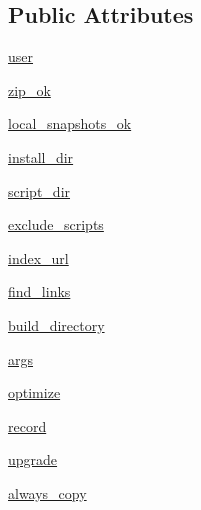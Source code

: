 \subsection*{Public Attributes}
\begin{DoxyCompactItemize}
\item 
\hyperlink{classsetuptools_1_1command_1_1easy__install_1_1easy__install_ae4bf410b8b658b1c1a709ae8947e7e2c}{user}
\item 
\hyperlink{classsetuptools_1_1command_1_1easy__install_1_1easy__install_a3cf027b47425e5bdedb5b0c6929346ba}{zip\+\_\+ok}
\item 
\hyperlink{classsetuptools_1_1command_1_1easy__install_1_1easy__install_ac990ee964a5fffad9b74da0491be48ea}{local\+\_\+snapshots\+\_\+ok}
\item 
\hyperlink{classsetuptools_1_1command_1_1easy__install_1_1easy__install_a1b80f13e00ade511bf1823bddce3341a}{install\+\_\+dir}
\item 
\hyperlink{classsetuptools_1_1command_1_1easy__install_1_1easy__install_acf30ffa16f1af2199c6342c4c7eae53c}{script\+\_\+dir}
\item 
\hyperlink{classsetuptools_1_1command_1_1easy__install_1_1easy__install_ad4f35f8a4e3aede4547ac57640dce932}{exclude\+\_\+scripts}
\item 
\hyperlink{classsetuptools_1_1command_1_1easy__install_1_1easy__install_a4f86d2376a54281ba9f8d503ba8cfcb4}{index\+\_\+url}
\item 
\hyperlink{classsetuptools_1_1command_1_1easy__install_1_1easy__install_ad44d29a7b59632e3860ec11bf8b3845d}{find\+\_\+links}
\item 
\hyperlink{classsetuptools_1_1command_1_1easy__install_1_1easy__install_addd15d5fea61ff7542f5330e1d5305c6}{build\+\_\+directory}
\item 
\hyperlink{classsetuptools_1_1command_1_1easy__install_1_1easy__install_a245326eef92af2fd2490071ec2fa271b}{args}
\item 
\hyperlink{classsetuptools_1_1command_1_1easy__install_1_1easy__install_acd3bdda216b3dad1afe4f777866190fc}{optimize}
\item 
\hyperlink{classsetuptools_1_1command_1_1easy__install_1_1easy__install_a5fed7200760a507706498813f350a424}{record}
\item 
\hyperlink{classsetuptools_1_1command_1_1easy__install_1_1easy__install_a320116ea1771a34a2097eb2922d78a0e}{upgrade}
\item 
\hyperlink{classsetuptools_1_1command_1_1easy__install_1_1easy__install_a81a4e66536cc8daacb77994c1dfee99d}{always\+\_\+copy}

\end{DoxyCompactItemize}
